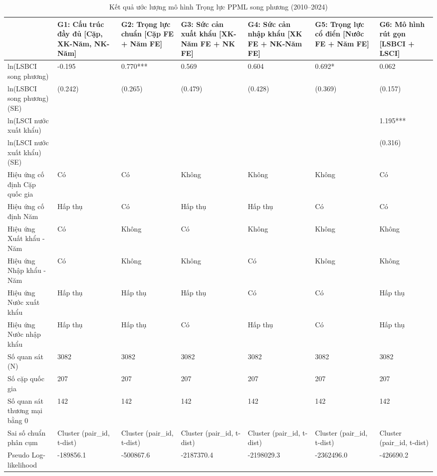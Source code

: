 \begin{table}
\caption{Kết quả ước lượng mô hình Trọng lực PPML song phương (2010--2024)}
\label{tab:gravity_ppml}
\begin{tabular}{lllllll}
\toprule
 & G1: Cấu trúc đầy đủ
[Cặp, XK-Năm, NK-Năm] & G2: Trọng lực chuẩn
[Cặp FE + Năm FE] & G3: Sức cản xuất khẩu
[XK-Năm FE + NK FE] & G4: Sức cản nhập khẩu
[XK FE + NK-Năm FE] & G5: Trọng lực cổ điển
[Nước FE + Năm FE] & G6: Mô hình rút gọn
[LSBCI + LSCI] \\
\midrule
ln(LSBCI song phương) & -0.195 & 0.770*** & 0.569 & 0.604 & 0.692* & 0.062 \\
ln(LSBCI song phương) (SE) & (0.242) & (0.265) & (0.479) & (0.428) & (0.369) & (0.157) \\
ln(LSCI nước xuất khẩu) &  &  &  &  &  & 1.195*** \\
ln(LSCI nước xuất khẩu) (SE) &  &  &  &  &  & (0.316) \\
Hiệu ứng cố định Cặp quốc gia & Có & Có & Không & Không & Không & Có \\
Hiệu ứng cố định Năm & Hấp thụ & Có & Hấp thụ & Hấp thụ & Có & Có \\
Hiệu ứng Xuất khẩu - Năm & Có & Không & Có & Không & Không & Không \\
Hiệu ứng Nhập khẩu - Năm & Có & Không & Không & Có & Không & Không \\
Hiệu ứng Nước xuất khẩu & Hấp thụ & Hấp thụ & Hấp thụ & Có & Có & Hấp thụ \\
Hiệu ứng Nước nhập khẩu & Hấp thụ & Hấp thụ & Có & Hấp thụ & Có & Hấp thụ \\
Số quan sát (N) & 3082 & 3082 & 3082 & 3082 & 3082 & 3082 \\
Số cặp quốc gia & 207 & 207 & 207 & 207 & 207 & 207 \\
Số quan sát thương mại bằng 0 & 142 & 142 & 142 & 142 & 142 & 142 \\
Sai số chuẩn phân cụm & Cluster (pair_id, t-dist) & Cluster (pair_id, t-dist) & Cluster (pair_id, t-dist) & Cluster (pair_id, t-dist) & Cluster (pair_id, t-dist) & Cluster (pair_id, t-dist) \\
Pseudo Log-likelihood & -189856.1 & -500867.6 & -2187370.4 & -2198029.3 & -2362496.0 & -426690.2 \\
\bottomrule
\end{tabular}
\end{table}
